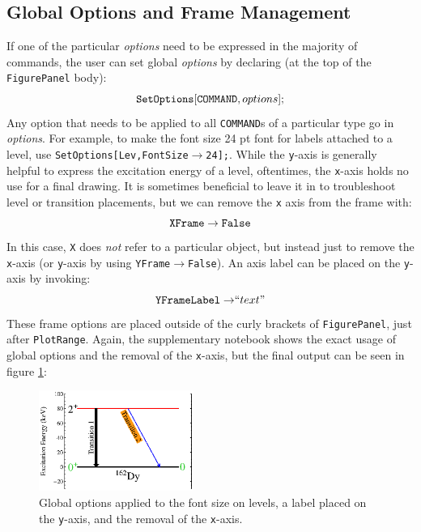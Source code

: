 \documentclass[portrait,10pt]{article}
\begin{document}
\subsection{Global Options and Frame Management}
If one of the particular \textit{options} need to be expressed in the majority of commands, the user can set global \textit{options} by declaring (at the top of the {\tt FigurePanel} body):
\begin{equation}\label{eq:TextNudge}
{\tt SetOptions[COMMAND},options];
\end{equation}
Any option that needs to be applied to all {\tt COMMAND}s of a particular type go in \textit{options}. For example, to make the font size 24 pt font for labels attached to a level, use {\tt SetOptions[Lev,FontSize$\rightarrow$24];}.
While the {\tt y}-axis is generally helpful to express the excitation energy of a level, oftentimes, the {\tt x}-axis holds no use for a final drawing. It is sometimes beneficial to leave it in to troubleshoot level or transition placements, but we can remove the {\tt x} axis from the frame with:
\begin{equation}\label{eq:XFrame}
{\tt XFrame\rightarrow False}
\end{equation}
In this case, {\tt X} does \textit{not} refer to a particular object, but instead just to remove the {\tt x}-axis (or {\tt y}-axis by using {\tt YFrame$\rightarrow$False}). An axis label can be placed on the {\tt y}-axis by invoking:
\begin{equation}\label{eq:YFrameLabel}
{\tt YFrameLabel\rightarrow}``text"
\end{equation}
These frame options are placed outside of the curly brackets of {\tt FigurePanel}, just after {\tt PlotRange}. Again, the supplementary notebook shows the exact usage of global options and the removal of the {\tt x}-axis, but the final output can be seen in figure \ref{fig:FinalOutput}:
\begin{figure}[h]
\begin{center}
\includegraphics[width=0.45\textwidth]{FinalOutput.eps}
\caption{Global options applied to the font size on levels, a label placed on the {\tt y}-axis, and the removal of the {\tt x}-axis. \label{fig:FinalOutput}}
\end{center}
\end{figure}
\end{document}
